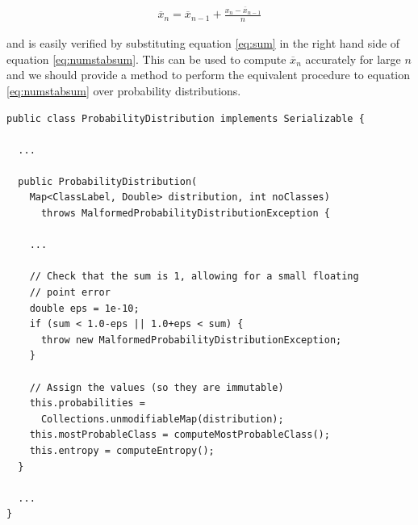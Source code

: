 \documentclass[12pt,twoside,notitlepage]{report}
\begin{document}
                \begin{align}
                    \overline{x}_n = \overline{x}_{n-1} + \frac{x_n - \overline{x}_{n-1}}{n}
                    \label{eq:numstabsum}
                \end{align} 

                and is easily verified by substituting equation \ref{eq:sum} in the right hand side of equation 
                \ref{eq:numstabsum}. This can be used to compute $\overline{x}_n$ accurately for large $n$ and we 
                should provide a method to perform the equivalent procedure to equation \ref{eq:numstabsum} over 
                probability distributions.

                \begin{lstlisting}[float=tp,caption={Part of the \texttt{ProbabilityDirstribution} constructor, where we set $\epsilon = 2^{-10}$.}]
public class ProbabilityDistribution implements Serializable {

  ...

  public ProbabilityDistribution(
    Map<ClassLabel, Double> distribution, int noClasses) 
      throws MalformedProbabilityDistributionException {
    
    ...
    
    // Check that the sum is 1, allowing for a small floating 
    // point error
    double eps = 1e-10;
    if (sum < 1.0-eps || 1.0+eps < sum) {
      throw new MalformedProbabilityDistributionException;
    }
    
    // Assign the values (so they are immutable)
    this.probabilities = 
      Collections.unmodifiableMap(distribution);
    this.mostProbableClass = computeMostProbableClass();
    this.entropy = computeEntropy();
  }

  ...
}
                \end{lstlisting}                
\end{document}
